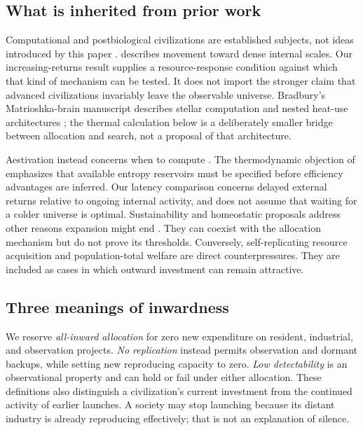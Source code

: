 \subsection{What is inherited from prior work}
Computational and postbiological civilizations are established subjects,
not ideas introduced by this paper \citep{Dick2003,CirkovicBradbury2006}.
\citet{Smart2012} describes movement toward dense internal scales. Our
increasing-returns result supplies a resource-response condition against
which that kind of mechanism can be tested. It does not import the stronger
claim that advanced civilizations invariably leave the observable universe.
Bradbury's Matrioshka-brain manuscript describes stellar computation and
nested heat-use architectures \citep{Bradbury1999}; the thermal calculation
below is a deliberately smaller bridge between allocation and search,
not a proposal of that architecture.

Aestivation instead concerns when to compute \citep{Sandberg2017}. The
thermodynamic objection of \citet{BennettHansonRiedel2019} emphasizes that
available entropy reservoirs must be specified before efficiency advantages
are inferred. Our latency comparison concerns delayed external returns
relative to ongoing internal activity, and does not assume that waiting
for a colder universe is optimal. Sustainability and homeostatic proposals
address other reasons expansion might end \citep{HaqqMisraBaum2009,WongBartlett2022}.
They can coexist with the allocation mechanism but do not prove its
thresholds. Conversely, self-replicating resource acquisition
\citep{ArmstrongSandberg2013} and population-total welfare
\citep{Bostrom2003Waste} are direct counterpressures. They are included as
cases in which outward investment can remain attractive.

\subsection{Three meanings of inwardness}
We reserve \emph{all-inward allocation} for zero new expenditure on resident,
industrial, and observation projects. \emph{No replication} instead permits
observation and dormant backups, while setting new reproducing capacity
to zero. \emph{Low detectability} is an observational property and can hold
or fail under either allocation. These definitions also distinguish a
civilization's current investment from the continued activity of earlier
launches. A society may stop launching because its distant industry is
already reproducing effectively; that is not an explanation of silence.

